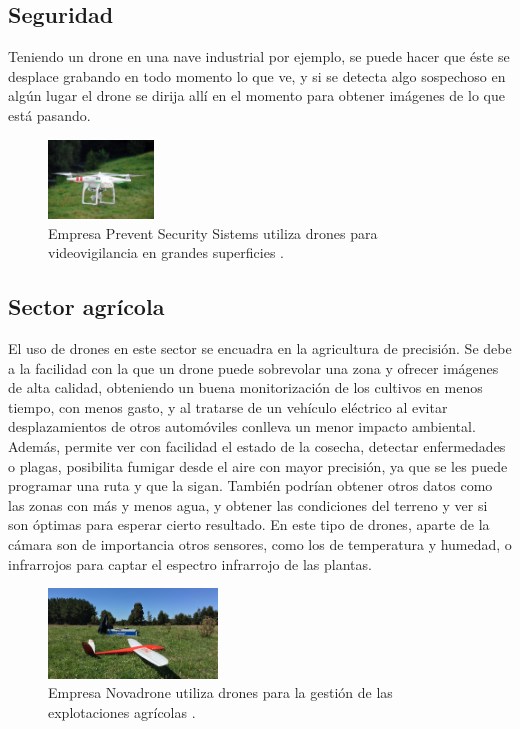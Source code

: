 \subsection{Seguridad} 
\hspace{1 cm}Teniendo un drone en una nave industrial por ejemplo, se puede hacer que \'este se desplace grabando en todo momento lo que ve, y si se detecta algo sospechoso en alg\'un lugar el drone se dirija all\'i en el momento para obtener im\'agenes de lo que est\'a pasando. 

\begin{figure}[H]
	\centering
		\includegraphics[width=0.25\textwidth]{imgs/seguridad_drone.jpg}
		\caption{Empresa Prevent Security Sistems utiliza drones para videovigilancia en grandes superficies .}
	\label{fig: Empresa Prevent Security Sistems realiza videovigilancia con drones.}
\end{figure}

	\subsection{Sector agr\'icola} 
\hspace{1 cm}El uso de drones en este sector se encuadra en la agricultura de precisi\'on. Se debe a la facilidad con la que un drone puede sobrevolar una zona y ofrecer im\'agenes de alta calidad, obteniendo un buena monitorizaci\'on de los cultivos en menos tiempo, con menos gasto, y al tratarse de un veh\'iculo el\'ectrico al evitar desplazamientos de otros autom\'oviles conlleva un menor impacto ambiental. Adem\'as, permite ver con facilidad el estado de la cosecha, detectar enfermedades o plagas, posibilita fumigar desde el aire con mayor precisi\'on, ya que se les puede programar una ruta y que la sigan. Tambi\'en podr\'ian obtener otros datos como las zonas con m\'as y menos agua, y obtener las condiciones del terreno y ver si son \'optimas para esperar cierto resultado. En este tipo de drones, aparte de la c\'amara son de importancia otros sensores, como los de temperatura y humedad, o infrarrojos para captar el espectro infrarrojo de las plantas. 

	
\begin{figure}[H]
	\centering
		\includegraphics[width=0.4\textwidth]{imgs/novadrone.jpg}
		\caption{Empresa Novadrone utiliza drones para la gesti\'on de las explotaciones agr\'icolas .}
	\label{fig: Empresa Novadrone, aplicaciones en agricultura.}
\end{figure}

